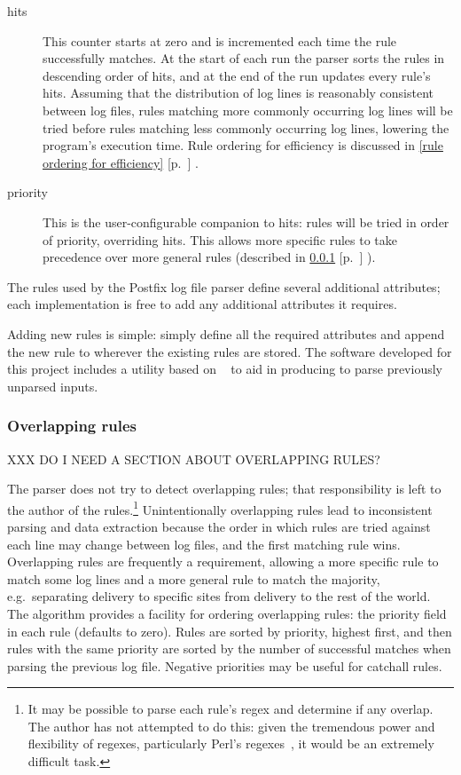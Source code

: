 \documentclass[draft]{svmult}
\newcommand{\refwithpage}[1]{%
    \empty{}\ref{#1} [p.~\pageref{#1}]%
}
\newcommand{\sectionref}[1]{%
    \textsection{}\refwithpage{#1}%
}
\begin{document}
\begin{description}
    \item [hits] This counter starts at zero and is incremented each time
        the rule successfully matches.  At the start of each run the parser
        sorts the rules in descending order of hits, and at the end of the
        run updates every rule's hits.  Assuming that the distribution of
        log lines is reasonably consistent between log files, rules
        matching more commonly occurring log lines will be tried before
        rules matching less commonly occurring log lines, lowering the
        program's execution time.  Rule ordering for efficiency is
        discussed in \sectionref{rule ordering for efficiency}.

    \item [priority] This is the user-configurable companion to hits: rules
        will be tried in order of priority, overriding hits.  This allows
        more specific rules to take precedence over more general rules
        (described in \sectionref{overlapping rules}).

\end{description}

The rules used by the Postfix log file parser define several additional
attributes; each implementation is free to add any additional attributes it
requires.

Adding new rules is simple: simply define all the required attributes and
append the new rule to wherever the existing rules are stored.  The
software developed for this project includes a utility based on
\SLCT{}~\cite{slct-paper} to aid in producing \regexes{} to parse
previously unparsed inputs.

\subsubsection{Overlapping rules}

\label{overlapping rules}

XXX DO I NEED A SECTION ABOUT OVERLAPPING RULES\@?

The parser does not try to detect overlapping rules; that responsibility is
left to the author of the rules.\footnote{It may be possible to parse each
rule's regex and determine if any overlap.  The author has not attempted to
do this: given the tremendous power and flexibility of regexes,
particularly Perl's regexes~\cite{perlre}, it would be an extremely
difficult task.} Unintentionally overlapping rules lead to inconsistent
parsing and data extraction because the order in which rules are tried
against each line may change between log files, and the first matching rule
wins.  Overlapping rules are frequently a requirement, allowing a more
specific rule to match some log lines and a more general rule to match the
majority, e.g.\ separating \SMTP{} delivery to specific sites from \SMTP{}
delivery to the rest of the world.  The algorithm provides a facility for
ordering overlapping rules: the priority field in each rule (defaults to
zero).  Rules are sorted by priority, highest first, and then rules with
the same priority are sorted by the number of successful matches when
parsing the previous log file.  Negative priorities may be useful for
catchall rules.
\end{document}
